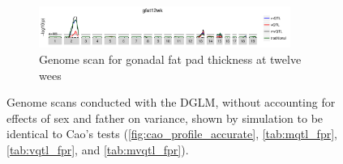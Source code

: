\begin{figure}[h]
\begin{subfigure}{\linewidth}
      \centering
      \includegraphics[width = 0.9\textwidth]{images/scan_cao_gfat12wk.pdf}
      \caption{Genome scan for gonadal fat pad thickness at twelve wees}
      \label{fig:gfat12wk_cao_scan}
    \end{subfigure}
    \caption{
      Genome scans conducted with the DGLM, without accounting for effects of sex and father on variance, shown by simulation to be identical to Cao's tests (\autoref{fig:cao_profile_accurate}, \autoref{tab:mqtl_fpr}, \autoref{tab:vqtl_fpr}, and \autoref{tab:mvqtl_fpr}).
    }
  \end{figure}
  

\FloatBarrier
\clearpage
